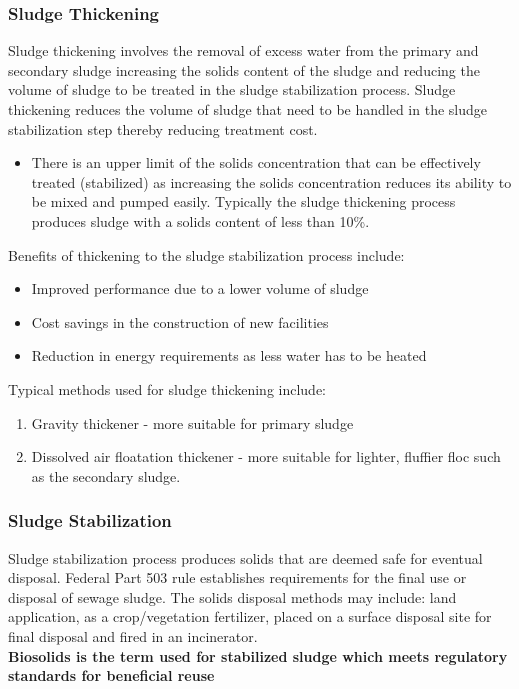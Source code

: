 \subsubsection{Sludge Thickening}
Sludge thickening involves the removal of excess water from the primary and secondary sludge increasing the solids content of the sludge and reducing the volume of sludge to be treated in the sludge stabilization process.
Sludge thickening reduces the volume of sludge that need to be handled in the sludge stabilization step thereby reducing treatment cost.  
\begin{itemize}
\item There is an upper limit of the solids concentration that can be effectively treated (stabilized) as increasing the solids concentration reduces its ability to be mixed and pumped easily.  Typically the sludge thickening process produces sludge with a solids content of less than 10\%.\\
\end{itemize}
Benefits of thickening to the sludge stabilization process include:
\begin{itemize}
\item Improved performance due to a lower volume of sludge
\item Cost savings in the construction of new facilities
\item Reduction in energy requirements as less water has to be heated
\end{itemize}
Typical methods used for sludge thickening include:
\begin{enumerate}
\item Gravity thickener - more suitable for primary sludge
\item Dissolved air floatation thickener - more suitable for lighter, fluffier floc such as the secondary sludge.
\end{enumerate}

\subsubsection{Sludge Stabilization}
Sludge stabilization process produces solids that are deemed safe for eventual disposal.  Federal Part 503 rule establishes requirements for the final use or disposal of sewage sludge.  The solids disposal methods may include: land application, as a crop/vegetation fertilizer, placed on a surface disposal site for final disposal and fired in an incinerator.\\
\textbf{Biosolids is the term used for stabilized sludge which meets regulatory standards for beneficial reuse}\\  


